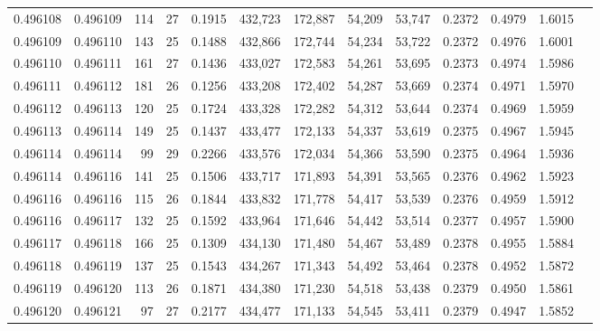 \begin{tabular}{rrrrrrrrrrrrr}
0.496108 & 0.496109 & 114 &  27 &                                     0.1915 & 432,723 & 172,887 &  54,209 &  53,747 & 0.2372 & 0.4979 & 1.6015 \\
0.496109 & 0.496110 & 143 &  25 &                                     0.1488 & 432,866 & 172,744 &  54,234 &  53,722 & 0.2372 & 0.4976 & 1.6001 \\
0.496110 & 0.496111 & 161 &  27 &                                     0.1436 & 433,027 & 172,583 &  54,261 &  53,695 & 0.2373 & 0.4974 & 1.5986 \\
0.496111 & 0.496112 & 181 &  26 &                                     0.1256 & 433,208 & 172,402 &  54,287 &  53,669 & 0.2374 & 0.4971 & 1.5970 \\
0.496112 & 0.496113 & 120 &  25 &                                     0.1724 & 433,328 & 172,282 &  54,312 &  53,644 & 0.2374 & 0.4969 & 1.5959 \\
0.496113 & 0.496114 & 149 &  25 &                                     0.1437 & 433,477 & 172,133 &  54,337 &  53,619 & 0.2375 & 0.4967 & 1.5945 \\
0.496114 & 0.496114 &  99 &  29 &                                     0.2266 & 433,576 & 172,034 &  54,366 &  53,590 & 0.2375 & 0.4964 & 1.5936 \\
0.496114 & 0.496116 & 141 &  25 &                                     0.1506 & 433,717 & 171,893 &  54,391 &  53,565 & 0.2376 & 0.4962 & 1.5923 \\
0.496116 & 0.496116 & 115 &  26 &                                     0.1844 & 433,832 & 171,778 &  54,417 &  53,539 & 0.2376 & 0.4959 & 1.5912 \\
0.496116 & 0.496117 & 132 &  25 &                                     0.1592 & 433,964 & 171,646 &  54,442 &  53,514 & 0.2377 & 0.4957 & 1.5900 \\
0.496117 & 0.496118 & 166 &  25 &                                     0.1309 & 434,130 & 171,480 &  54,467 &  53,489 & 0.2378 & 0.4955 & 1.5884 \\
0.496118 & 0.496119 & 137 &  25 &                                     0.1543 & 434,267 & 171,343 &  54,492 &  53,464 & 0.2378 & 0.4952 & 1.5872 \\
0.496119 & 0.496120 & 113 &  26 &                                     0.1871 & 434,380 & 171,230 &  54,518 &  53,438 & 0.2379 & 0.4950 & 1.5861 \\
0.496120 & 0.496121 &  97 &  27 &                                     0.2177 & 434,477 & 171,133 &  54,545 &  53,411 & 0.2379 & 0.4947 & 1.5852 \\

\end{tabular}
